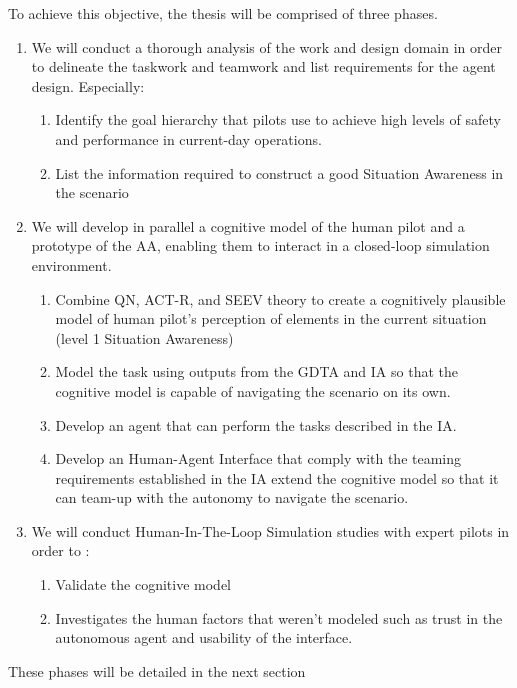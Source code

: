 \documentclass[12pt,a4paper]{article} %
\begin{document}
	To achieve this objective, the thesis will be comprised of three phases.
	\begin{enumerate}[label=\textbf{\arabic*.}]
		\item We will conduct a thorough analysis of the work and design domain in order to delineate the taskwork and teamwork and list requirements for the agent design. Especially:
		\begin{enumerate}[label=\textbf{\arabic{enumi}.\Alph*.}]
			\item \label{obj:1a} Identify the goal hierarchy that pilots use to achieve high levels of safety and performance in current-day operations.
			\item \label{obj:1b} List the information required to construct a good Situation Awareness in the scenario 
		\end{enumerate}
		\item We will develop in parallel a cognitive model of the human pilot and a prototype of the AA, enabling them to interact in a closed-loop simulation environment. 
		\begin{enumerate}[label=\textbf{\arabic{enumi}.\Alph*.}]
			\item \label{obj:2a} Combine QN, ACT-R, and SEEV theory to create a cognitively plausible model of human pilot's perception of elements in the current situation (level 1 Situation Awareness)
			\item \label{obj:2b} Model the task using outputs from the GDTA and IA so that the cognitive model is capable of navigating the scenario on its own.
			\item \label{obj:2c} Develop an agent that can perform the tasks described in the IA.
			\item \label{obj:2d} Develop an Human-Agent Interface that comply with the teaming requirements established in the IA extend the cognitive model so that it can team-up with the autonomy to navigate the scenario.
		\end{enumerate}  
		\item We will conduct Human-In-The-Loop Simulation studies with expert pilots in order to :
		\begin{enumerate}[label=\textbf{\arabic{enumi}.\Alph*.}]
			\item \label{obj:3a} Validate the cognitive model
			\item \label{obj:3b} Investigates the human factors that weren't modeled such as trust in the autonomous agent and usability of the interface.
		\end{enumerate}
	\end{enumerate}
	These phases will be detailed in the next section 
	
\end{document}
